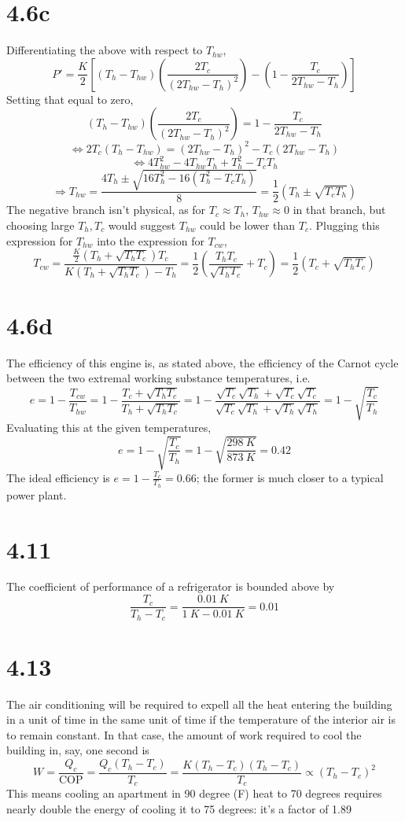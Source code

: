 \documentclass{article}
\begin{document}
\section*{4.6c}
Differentiating the above with respect to $T_{hw}$,
\[P'=\frac{K}{2}\left[ (T_{h}-T_{hw})\left(  \frac{2T_{c}}{(2T_{hw}-T_{h})^{2}}\right)-\left( 1-\frac{T_{c}}{2T_{hw}-T_{h}} \right)\right]\]
Setting that equal to zero,
\[(T_{h}-T_{hw})\left( \frac{2T_{c}}{(2T_{hw}-T_{h})^{2}} \right)=1-\frac{T_{c}}{2T_{hw}-T_{h}}\]\[\Leftrightarrow 2T_{c}(T_{h}-T_{hw})=(2T_{hw}-T_{h})^{2}-T_{c}(2T_{hw}-T_{h})\]
\[\Leftrightarrow 4T_{hw}^{2}-4T_{hw}T_{h}+T_{h}^{2}-T_{c}T_{h}\]
\[\Rightarrow T_{hw}=\frac{4T_{h}\pm\sqrt{16T_{h}^{2}-16(T_{h}^{2}-T_{c}T_{h})}}{8}=\frac{1}{2}\left( T_{h}\pm\sqrt{T_{c}T_{h}} \right)\]
The negative branch isn't physical, as for $T_{c}\approx T_{h}$, $T_{hw}\approx 0$ in that branch, but choosing large $T_{h},T_{c}$ would suggest $T_{hw}$ could be lower than $T_{c}$. Plugging this expression for $T_{hw}$ into the expression for $T_{cw}$,
\[T_{cw}=\frac{\frac{K}{2}(T_{h}+\sqrt{T_{h}T_{c}})T_{c}}{K(T_{h}+\sqrt{T_{h}T_{c}})-T_{h}}=\frac{1}{2}\left( \frac{T_{h}T_{c}}{\sqrt{T_{h}T_{c}}}+T_{c} \right)=\frac{1}{2}(T_{c}+\sqrt{T_{h}T_{c}})\]

\section*{4.6d}
The efficiency of this engine is, as stated above, the efficiency of the Carnot cycle between the two extremal working substance temperatures, i.e.
\[e=1-\frac{T_{cw}}{T_{hw}}=1-\frac{T_{c}+\sqrt{T_{h}T_{c}}}{T_{h}+\sqrt{T_{h}T_{c}}}=1-\frac{\sqrt{T_{c}}\sqrt{T_{h}}+\sqrt{T_{c}}\sqrt{T_{c}}}{\sqrt{T_{c}}\sqrt{T_{h}}+\sqrt{T_{h}}\sqrt{T_{h}}}=1-\sqrt{\frac{T_{c}}{T_{h}}}\]
Evaluating this at the given temperatures,
\[e=1-\sqrt{\frac{T_{c}}{T_{h}}}=1-\sqrt{\frac{\SI{298}{K}}{\SI{873}{K}}}=0.42\]
The ideal efficiency is $e=1-\frac{T_{c}}{T_{h}}=0.66$; the former is much closer to a typical power plant.
\section*{4.11}
The coefficient of performance of a refrigerator is bounded above by
\[\frac{T_{c}}{T_{h}-T_{c}}=\frac{\SI{0.01}{K}}{\SI{1}{K}-\SI{0.01}{K}}=0.01\]

\section*{4.13}
The air conditioning will be required to expell all the heat entering the building in a unit of time in the same unit of time if the temperature of the interior air is to remain constant. In that case, the amount of work required to cool the building in, say, one second is
\[W=\frac{Q_{c}}{\textrm{COP}}=\frac{Q_{c}(T_{h}-T_{c})}{T_{c}}=\frac{K(T_{h}-T_{c})(T_{h}-T_{c})}{T_{c}}\propto (T_{h}-T_{c})^{2}\]
This means cooling an apartment in 90 degree (F) heat to 70 degrees requires nearly double the energy of cooling it to 75 degrees: it's a factor of 1.89
\end{document}
